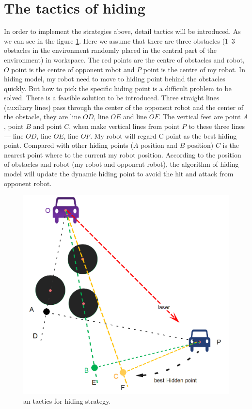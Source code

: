 \section{The tactics of hiding}
In order to implement the strategies above, detail tactics will be introduced. As we can see in the figure \ref{hiding_tactic}. Here we assume that there are three obstacles (1~3 obstacles in the environment randomly placed in the central part of the environment) in workspace. The red points are the centre of obstacles and robot,  $O$ point is the centre of opponent robot and $P$ point is the centre of my robot. In hiding model,  my robot need to move to hiding point behind the obstacles quickly. But how to pick the specific hiding point is a difficult problem to be solved. There is a feasible solution to be introduced.
Three straight lines (auxiliary lines) pass through the center of the opponent robot and the center of the obstacle, they are line $OD$, line $OE$ and line $OF$. The vertical feet are point $A$, point $B$ and point $C$, when make vertical lines from point $P$ to these three lines— line $OD$, line $OE$, line $OF$. My robot will regard C point as the best hiding point. Compared with other hiding points ($A$ position and $B$ position) $C$ is the nearest point where to the current my robot position. According to the position of obstacles and robot (my robot and opponent robot), the algorithm of hiding model will update the dynamic hiding point to avoid the hit and attack from opponent robot.

\begin{figure}[thb]
    \centering
    \includegraphics[width=1\textwidth]{images/PathPlaningHidingModel.png}
    \caption[an tactics for  hiding strategy]{an tactics for  hiding strategy.}\label{hiding_tactic}
\end{figure}

